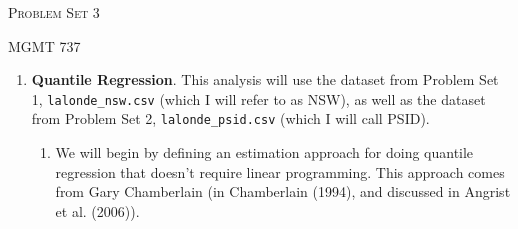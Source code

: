 \documentclass[11pt, a4paper]{article}
\begin{document}
\begin{center}
  {\Large \textsc{Problem Set 3}}

  MGMT 737
\end{center}


\begin{enumerate}
\item \textbf{Quantile Regression}. This analysis will use the dataset
  from Problem Set 1, \texttt{lalonde\_nsw.csv} (which I will refer to
  as NSW), as well as the dataset from Problem Set 2,
  \texttt{lalonde\_psid.csv} (which I will call PSID).
  \begin{enumerate}
  \item We will begin by defining an estimation approach for doing
    quantile regression that doesn't require linear programming. This
    approach comes from Gary Chamberlain (in Chamberlain (1994), and
    discussed in Angrist et al. (2006)). 


\end{enumerate}
\end{enumerate}
\end{document}
